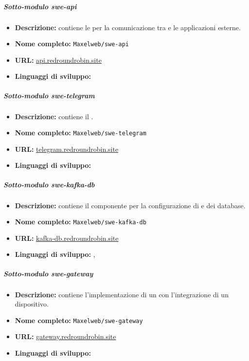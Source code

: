 		\subparagraph{Sotto-modulo swe-api}

		\begin{itemize}
		 	\item \textbf{Descrizione:} contiene le  per la comunicazione tra  e le applicazioni esterne.
		 	\item \textbf{Nome completo:} \verb!Maxelweb/swe-api!
		 	\item \textbf{URL:} \href{https://github.com/Maxelweb/swe-api}{api.redroundrobin.site}
		 	\item \textbf{Linguaggi di sviluppo:} 
		 \end{itemize}

		\subparagraph{Sotto-modulo swe-telegram}

		\begin{itemize}
		 	\item \textbf{Descrizione:} contiene il .
		 	\item \textbf{Nome completo:} \verb!Maxelweb/swe-telegram!
		 	\item \textbf{URL:} \href{https://github.com/Maxelweb/swe-telegram}{telegram.redroundrobin.site}
		 	\item \textbf{Linguaggi di sviluppo:} 
		 \end{itemize}

		\subparagraph{Sotto-modulo swe-kafka-db}

		\begin{itemize}
		 	\item \textbf{Descrizione:} contiene il componente per la configurazione di  e dei database.
		 	\item \textbf{Nome completo:} \verb!Maxelweb/swe-kafka-db!
		 	\item \textbf{URL:} \href{https://github.com/Maxelweb/swe-kafka-db}{kafka-db.redroundrobin.site}
		 	\item \textbf{Linguaggi di sviluppo:} , 
		 \end{itemize}

		 \subparagraph{Sotto-modulo swe-gateway}

		\begin{itemize}
		 	\item \textbf{Descrizione:} contiene l'implementazione di un  con l'integrazione di un dispositivo.
		 	\item \textbf{Nome completo:} \verb!Maxelweb/swe-gateway!
		 	\item \textbf{URL:} \href{https://github.com/Maxelweb/swe-gateway}{gateway.redroundrobin.site}
		 	\item \textbf{Linguaggi di sviluppo:} 
		 \end{itemize}



